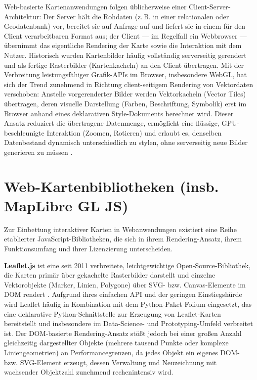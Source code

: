 \documentclass[12pt,a4paper]{report}
\begin{document}
Web-basierte Kartenanwendungen folgen üblicherweise einer Client-Server-Architektur: Der Server hält die Rohdaten (z.\,B. in einer relationalen oder Geodatenbank) vor, bereitet sie auf Anfrage auf und liefert sie in einem für den Client verarbeitbaren Format aus; der Client — im Regelfall ein Webbrowser — übernimmt das eigentliche Rendering der Karte sowie die Interaktion mit dem Nutzer. Historisch wurden Kartenbilder häufig vollständig serverseitig gerendert und als fertige Rasterbilder (Kartenkacheln) an den Client übertragen. Mit der Verbreitung leistungsfähiger Grafik-APIs im Browser, insbesondere WebGL, hat sich der Trend zunehmend in Richtung client-seitigem Rendering von Vektordaten verschoben: Anstelle vorgerenderter Bilder werden Vektorkacheln (Vector Tiles) übertragen, deren visuelle Darstellung (Farben, Beschriftung, Symbolik) erst im Browser anhand eines deklarativen Style-Dokuments berechnet wird. Dieser Ansatz reduziert die übertragene Datenmenge, ermöglicht eine flüssige, GPU-beschleunigte Interaktion (Zoomen, Rotieren) und erlaubt es, denselben Datenbestand dynamisch unterschiedlich zu stylen, ohne serverseitig neue Bilder generieren zu müssen \cite{TODO:VectorTiles}.

\section{Web-Kartenbibliotheken (insb. MapLibre GL JS)}

Zur Einbettung interaktiver Karten in Webanwendungen existiert eine Reihe etablierter JavaScript-Bibliotheken, die sich in ihrem Rendering-Ansatz, ihrem Funktionsumfang und ihrer Lizenzierung unterscheiden.

\textbf{Leaflet.js} ist eine seit 2011 verbreitete, leichtgewichtige Open-Source-Bibliothek, die Karten primär über gekachelte Rasterbilder darstellt und einzelne Vektorobjekte (Marker, Linien, Polygone) über SVG- bzw. Canvas-Elemente im DOM rendert \cite{TODO:LeafletDoc}. Aufgrund ihres einfachen API und der geringen Einstiegshürde wird Leaflet häufig in Kombination mit dem Python-Paket Folium eingesetzt, das eine deklarative Python-Schnittstelle zur Erzeugung von Leaflet-Karten bereitstellt und insbesondere im Data-Science- und Prototyping-Umfeld verbreitet ist. Der DOM-basierte Rendering-Ansatz stößt jedoch bei einer großen Anzahl gleichzeitig dargestellter Objekte (mehrere tausend Punkte oder komplexe Liniengeometrien) an Performancegrenzen, da jedes Objekt ein eigenes DOM- bzw. SVG-Element erzeugt, dessen Verwaltung und Neuzeichnung mit wachsender Objektzahl zunehmend rechenintensiv wird.
\end{document}
